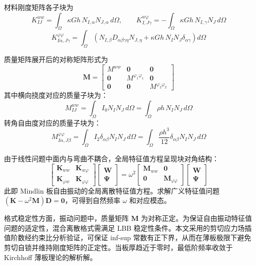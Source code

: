 材料刚度矩阵各子块为
\begin{equation}
K_{IJ}^{ww} = \int_\Omega \kappa G h\, N_{I,\alpha} N_{J,\alpha}\, d\Omega, \qquad K_{I,J\gamma}^{w\varphi} = -\int_\Omega \kappa G h\, N_{I,\gamma} N_J\, d\Omega
\end{equation}
\begin{equation}
K_{I\alpha,J\gamma}^{\varphi\varphi} = \int_\Omega \left(N_{I,\beta} D_{\alpha\beta\gamma\eta} N_{J,\eta} + \kappa G h\, N_I N_J \delta_{\alpha\gamma}\right) d\Omega
\end{equation}

质量矩阵展开后的对称矩阵形式为
\begin{equation}
\mathbf{M} = \begin{bmatrix}
M^{ww} & \mathbf{0} & \mathbf{0} \\
\mathbf{0} & M^{\varphi_1\varphi_1} & \mathbf{0} \\
\mathbf{0} & \mathbf{0} & M^{\varphi_2\varphi_2}
\end{bmatrix}
\end{equation}
其中横向挠度对应的质量子块为：
\begin{equation}
M_{IJ}^{ww} = \int_\Omega I_0 N_I N_J\, d\Omega = \int_\Omega \rho h\, N_I N_J\, d\Omega
\end{equation}
转角自由度对应的质量子块为：
\begin{equation}
M_{I\alpha,J\beta}^{\varphi\varphi} = \int_\Omega I_2 \delta_{\alpha\beta} N_I N_J\, d\Omega = \int_\Omega \frac{\rho h^3}{12} \delta_{\alpha\beta} N_I N_J\, d\Omega
\end{equation}

由于线性问题中面内与弯曲不耦合，全局特征值方程呈现块对角结构：
\begin{equation}
\begin{bmatrix}
\mathbf{K}_{ww} & \mathbf{K}_{w\varphi} \\
\mathbf{K}_{\varphi w} & \mathbf{K}_{\varphi\varphi}
\end{bmatrix}
\begin{bmatrix}
\mathbf{W} \\
\boldsymbol{\Psi}
\end{bmatrix}
= \omega^2
\begin{bmatrix}
\mathbf{M}_{ww} & \mathbf{0} \\
\mathbf{0} & \mathbf{M}_{\varphi\varphi}
\end{bmatrix}
\begin{bmatrix}
\mathbf{W} \\
\boldsymbol{\Psi}
\end{bmatrix}
\end{equation}
此即 Mindlin 板自由振动的全局离散特征值方程。求解广义特征值问题 $(\mathbf{K} - \omega^2\mathbf{M})\mathbf{D} = \mathbf{0}$，可得到自然频率 $\omega$ 和对应模态。

格式稳定性方面，振动问题中，质量矩阵 $\mathbf{M}$ 为对称正定。为保证自由振动特征值问题的适定性，混合离散格式需满足 LBB 稳定性条件。本文采用的剪切应力场插值阶数经约束比分析验证，可保证 inf-sup 常数有正下界，从而在薄板极限下避免剪切自锁并维持刚度矩阵的正定性。当板厚趋近于零时，最低阶频率收敛于 Kirchhoff 薄板理论的解析解。
